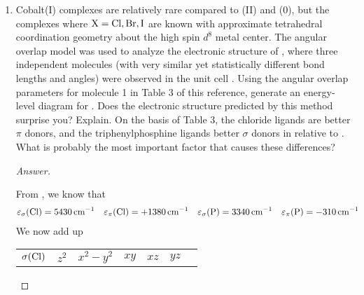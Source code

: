 \documentclass[../psets.tex]{subfiles}
\begin{document}
\begin{enumerate}[label={\Roman*)}]
\begin{enumerate}[label={\textbf{10.\arabic*}}]
\begin{enumerate}[label={\textbf{\alph*.}}]
        \end{enumerate}
        \newpage
        \setcounter{enumii}{26}
        \item Cobalt(I) complexes are relatively rare compared to (II) and (0), but the complexes  where $\ce{X}=\ce{Cl},\ce{Br},\ce{I}$ are known with approximate tetrahedral coordination geometry about the high spin $d^8$ metal center. The angular overlap model was used to analyze the electronic structure of , where three independent molecules (with very similar yet statistically different bond lengths and angles) were observed in the unit cell \parencite{bib:pset7-1027}. Using the angular overlap parameters for molecule 1 in Table 3 of this reference, generate an energy-level diagram for . Does the electronic structure predicted by this method surprise you? Explain. On the basis of Table 3, the chloride ligands are better $\pi$ donors, and the triphenylphosphine ligands better $\sigma$ donors in  relative to . What is probably the most important factor that causes these differences?
        \begin{proof}[Answer]
            ${\color{white}hi}$
            \begin{center}
            \end{center}
            \vspace{1em}
            From \textcite{bib:pset7-1027}, we know that
            \begin{align*}
                \varepsilon_\sigma(\ce{Cl}) &= \SI{5430}{\per\centi\meter}&
                \varepsilon_\pi(\ce{Cl}) &= +\SI{1380}{\per\centi\meter}&
                \varepsilon_\sigma(\ce{P}) &= \SI{3340}{\per\centi\meter}&
                \varepsilon_\pi(\ce{P}) &= -\SI{310}{\per\centi\meter}
            \end{align*}
            We now add up
            \begin{center}
                \small
                \renewcommand{\arraystretch}{1.4}
                \begin{tabular}{c|cccccc}
                    $\sigma(\ce{Cl})$ & $z^2$ & $x^2-y^2$ & $xy$ & $xz$ & $yz$\\

\end{tabular}
\end{center}
\end{proof}
\end{enumerate}
\end{enumerate}
\end{document}
